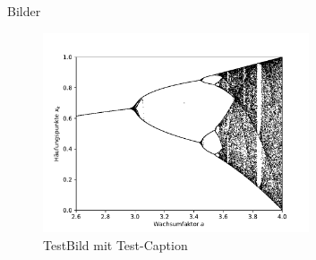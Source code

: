 \documentclass[aspectratio=1610]{beamer}
\begin{document}
\begin{frame}{Bilder}

\begin{figure}
  \centering
\includegraphics[width=0.7\textwidth]{feigenbaumdiagramm.pdf}
  \caption{TestBild mit Test-Caption}
  \label{fig: testfigure}
\end{figure}


\end{frame}
\end{document}
